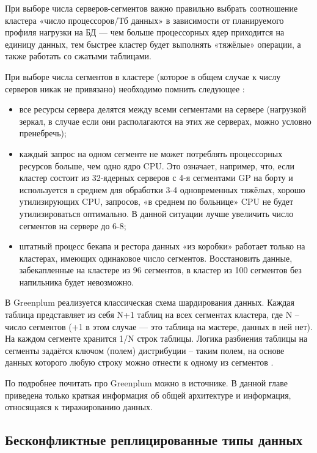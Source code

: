 При выборе числа серверов-сегментов важно правильно выбрать соотношение кластера «число процессоров/Тб данных» в
зависимости от планируемого профиля нагрузки на БД — чем больше процессорных ядер приходится на единицу данных, тем
быстрее кластер будет выполнять «тяжёлые» операции, а также работать со сжатыми таблицами.

При выборе числа сегментов в кластере (которое в общем случае к числу серверов никак не привязано) необходимо помнить
следующее \autocite{Greenplum}:
\begin{itemize}
    \item все ресурсы сервера делятся между всеми сегментами на сервере (нагрузкой зеркал, в случае если они располагаются на этих же серверах, можно условно пренебречь);
    \item каждый запрос на одном сегменте не может потреблять процессорных ресурсов больше, чем одно ядро CPU. Это означает, например, что, если кластер состоит из 32-ядерных серверов с 4-я сегментами GP на борту и используется в среднем для обработки 3-4 одновременных тяжёлых, хорошо утилизирующих CPU, запросов, «в среднем по больнице» CPU не будет утилизироваться оптимально. В данной ситуации лучше увеличить число сегментов на сервере до 6-8;
    \item штатный процесс бекапа и рестора данных «из коробки» работает только на кластерах, имеющих одинаковое число сегментов. Восстановить данные, забекапленные на кластере из 96 сегментов, в кластер из 100 сегментов без напильника будет невозможно.
\end{itemize}

В Greenplum реализуется классическая схема шардирования данных. Каждая таблица представляет из себя N+1 таблиц на всех
сегментах кластера, где N – число сегментов (+1 в этом случае — это таблица на мастере, данных в ней нет). На каждом
сегменте хранится 1/N строк таблицы. Логика разбиения таблицы на сегменты задаётся ключом (полем) дистрибуции – таким
полем, на основе данных которого любую строку можно отнести к одному из сегментов \autocite{Greenplum}.

По подробнее почитать про Greenplum можно в источнике. В данной главе приведена только краткая информация об общей
архитектуре и информация, относящаяся к тиражированию данных. \autocite{Greenplum}

\subsection{Бесконфликтные реплицированные типы данных}

